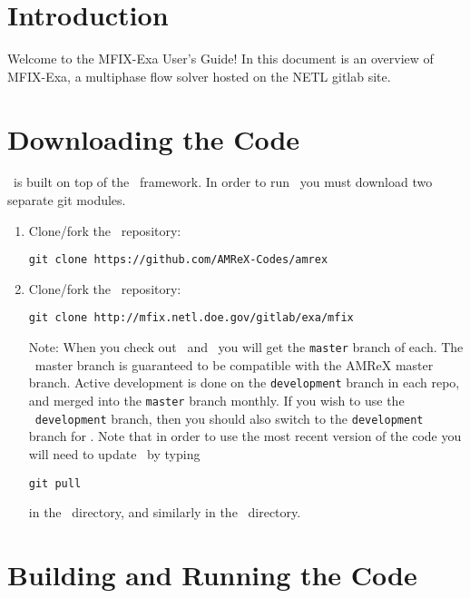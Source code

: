 
\section{Introduction}

Welcome to the MFIX-Exa User's Guide!  In this document is an overview 
of MFIX-Exa, a multiphase flow solver hosted on the NETL gitlab site. 

\section{Downloading the Code}

\mfix\ is built on top of the \amrex\ framework.  In order to run
\mfix\, you must download two separate git modules.

\vspace{.1in}

\vspace{.1in}

\begin{enumerate}

\item Clone/fork the \amrex\ repository:
\begin{verbatim}
git clone https://github.com/AMReX-Codes/amrex
\end{verbatim}

\item Clone/fork the \mfix\ repository:
\begin{verbatim}
git clone http://mfix.netl.doe.gov/gitlab/exa/mfix
\end{verbatim}

Note: When you check out \mfix\ and \amrex\, you will get the {\tt master}
branch of each.   The \mfix\ master branch is guaranteed to be compatible
with the AMReX master branch.
Active development is done on the {\tt development} branch
in each repo, and merged into the {\tt master} branch monthly.
If you wish to use the \mfix\ {\tt development} branch, then you
should also switch to the {\tt development} branch for \amrex.
Note that in order to use the most recent version of the code you 
will need to update \amrex\ by typing
\begin{verbatim}
git pull
\end{verbatim}
in the \amrex\ directory, and similarly in the \mfix\ directory.

\end{enumerate}

\section{Building and Running the Code}

